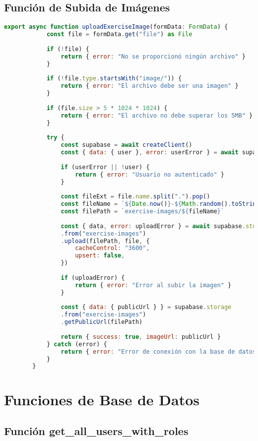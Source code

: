 \documentclass[12pt,a4paper]{article}
\begin{document}
	\subsection{Función de Subida de Imágenes}
	
	\begin{lstlisting}[language=JavaScript, caption=Función uploadExerciseImage]
		export async function uploadExerciseImage(formData: FormData) {
			const file = formData.get("file") as File
			
			if (!file) {
				return { error: "No se proporcionó ningún archivo" }
			}
			
			if (!file.type.startsWith("image/")) {
				return { error: "El archivo debe ser una imagen" }
			}
			
			if (file.size > 5 * 1024 * 1024) {
				return { error: "El archivo no debe superar los 5MB" }
			}
			
			try {
				const supabase = await createClient()
				const { data: { user }, error: userError } = await supabase.auth.getUser()
				
				if (userError || !user) {
					return { error: "Usuario no autenticado" }
				}
				
				const fileExt = file.name.split(".").pop()
				const fileName = `${Date.now()}-${Math.random().toString(36).substring(7)}.${fileExt}`
				const filePath = `exercise-images/${fileName}`
				
				const { data, error: uploadError } = await supabase.storage
				.from("exercise-images")
				.upload(filePath, file, {
					cacheControl: "3600",
					upsert: false,
				})
				
				if (uploadError) {
					return { error: "Error al subir la imagen" }
				}
				
				const { data: { publicUrl } } = supabase.storage
				.from("exercise-images")
				.getPublicUrl(filePath)
				
				return { success: true, imageUrl: publicUrl }
			} catch (error) {
				return { error: "Error de conexión con la base de datos" }
			}
		}
	\end{lstlisting}
	
	\section{Funciones de Base de Datos}
	
	\subsection{Función get\_all\_users\_with\_roles}
	
\end{document}

